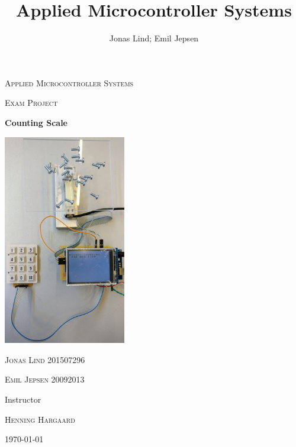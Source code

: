 \documentclass[12pt,a4paper,oneside]{report}
\author{Jonas Lind; Emil Jepsen}
\title{Applied Microcontroller Systems}
\begin{document}
\begin{titlepage}
	\centering
	{\scshape\LARGE Applied Microcontroller Systems \par}
	\vspace{1cm}
	{\scshape\Large Exam Project\par}
	\vspace{1.5cm}
	{\huge\bfseries Counting Scale \par}
	\vspace{.8cm}
	\includegraphics[width=0.4\textwidth]{graphics/frontpage}\par\vspace{1cm}
	{\Large\scshape Jonas Lind 201507296\par}
	{\Large\scshape Emil Jepsen 20092013\par}
	\vfill
	Instructor \par
	\textsc{Henning Hargaard}
	
	\vfill
	
	{\large \today\par}
\end{titlepage}

\setcounter{chapter}{1}
	
\end{document}
